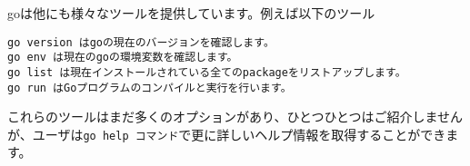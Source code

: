  goは他にも様々なツールを提供しています。例えば以下のツール

\begin{lstlisting}[numbers=none]
go version はgoの現在のバージョンを確認します。
go env は現在のgoの環境変数を確認します。
go list は現在インストールされている全てのpackageをリストアップします。
go run はGoプログラムのコンパイルと実行を行います。
\end{lstlisting}


これらのツールはまだ多くのオプションがあり、ひとつひとつはご紹介しませんが、ユーザは\texttt{go help コマンド}で更に詳しいヘルプ情報を取得することができます。
